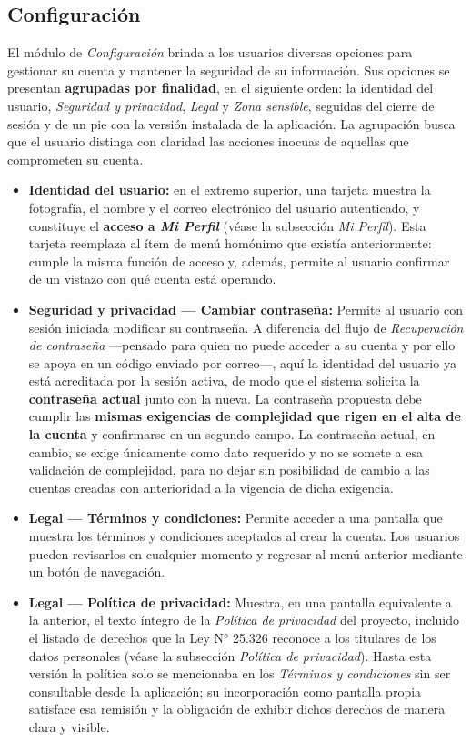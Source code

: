\documentclass[a4paper,12pt]{article}
\begin{document}
    \subsection{Configuración}
    \par El módulo de \textit{Configuración} brinda a los usuarios diversas opciones para gestionar su cuenta y mantener la seguridad de su información. Sus opciones se presentan \textbf{agrupadas por finalidad}, en el siguiente orden: la identidad del usuario, \textit{Seguridad y privacidad}, \textit{Legal} y \textit{Zona sensible}, seguidas del cierre de sesión y de un pie con la versión instalada de la aplicación. La agrupación busca que el usuario distinga con claridad las acciones inocuas de aquellas que comprometen su cuenta.
    \begin{itemize}
        \item \textbf{Identidad del usuario:} en el extremo superior, una tarjeta muestra la fotografía, el nombre y el correo electrónico del usuario autenticado, y constituye el \textbf{acceso a \textit{Mi Perfil}} (véase la subsección \textit{Mi Perfil}). Esta tarjeta reemplaza al ítem de menú homónimo que existía anteriormente: cumple la misma función de acceso y, además, permite al usuario confirmar de un vistazo con qué cuenta está operando.
        \item \textbf{Seguridad y privacidad — Cambiar contraseña:} Permite al usuario con sesión iniciada modificar su contraseña. A diferencia del flujo de \textit{Recuperación de contraseña} —pensado para quien no puede acceder a su cuenta y por ello se apoya en un código enviado por correo—, aquí la identidad del usuario ya está acreditada por la sesión activa, de modo que el sistema solicita la \textbf{contraseña actual} junto con la nueva. La contraseña propuesta debe cumplir las \textbf{mismas exigencias de complejidad que rigen en el alta de la cuenta} y confirmarse en un segundo campo. La contraseña actual, en cambio, se exige únicamente como dato requerido y no se somete a esa validación de complejidad, para no dejar sin posibilidad de cambio a las cuentas creadas con anterioridad a la vigencia de dicha exigencia.
        \item \textbf{Legal — Términos y condiciones:} Permite acceder a una pantalla que muestra los términos y condiciones aceptados al crear la cuenta. Los usuarios pueden revisarlos en cualquier momento y regresar al menú anterior mediante un botón de navegación.
        \item \textbf{Legal — Política de privacidad:} Muestra, en una pantalla equivalente a la anterior, el texto íntegro de la \textit{Política de privacidad} del proyecto, incluido el listado de derechos que la Ley N° 25.326 reconoce a los titulares de los datos personales (véase la subsección \textit{Política de privacidad}). Hasta esta versión la política solo se mencionaba en los \textit{Términos y condiciones} sin ser consultable desde la aplicación; su incorporación como pantalla propia satisface esa remisión y la obligación de exhibir dichos derechos de manera clara y visible.

\end{itemize}
\end{document}
